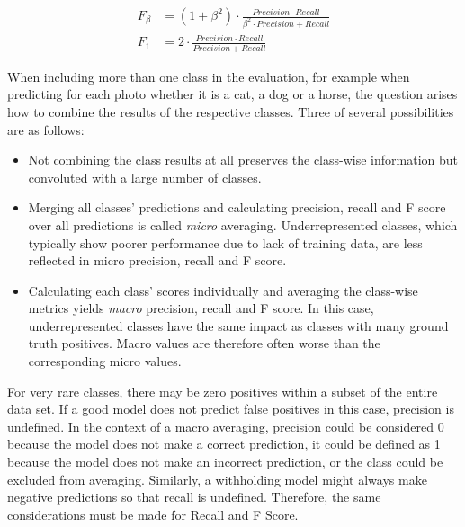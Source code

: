 \begin{align}
    F_\beta &= (1 + \beta^2) \cdot \frac{Precision \cdot Recall}{\beta^2 \cdot Precision + Recall}
    \label{eq:2_basics/4_metrics/3_prf/f_beta} \\
    F_1 &= 2 \cdot \frac{Precision \cdot Recall}{Precision + Recall}
    \label{eq:2_basics/4_metrics/3_prf/f_1}
\end{align}

When including more than one class in the evaluation, for example when predicting for each photo whether it is a cat, a dog or a horse, the question arises how to combine the results of the respective classes. Three of several possibilities are as follows:

\begin{itemize}
    \item Not combining the class results at all preserves the class-wise information but convoluted with a large number of classes.

    \item Merging all classes' predictions and calculating precision, recall and F score over all predictions is called \emph{micro} averaging. Underrepresented classes, which typically show poorer performance due to lack of training data, are less reflected in micro precision, recall and F score.

    \item Calculating each class' scores individually and averaging the class-wise metrics yields \emph{macro} precision, recall and F score. In this case, underrepresented classes have the same impact as classes with many ground truth positives. Macro values are therefore often worse than the corresponding micro values.
\end{itemize}

For very rare classes, there may be zero positives within a subset of the entire data set. If a good model does not predict false positives in this case, precision is undefined. In the context of a macro averaging, precision could be considered 0 because the model does not make a correct prediction, it could be defined as 1 because the model does not make an incorrect prediction, or the class could be excluded from averaging. Similarly, a withholding model might always make negative predictions so that recall is undefined. Therefore, the same considerations must be made for Recall and F Score.

